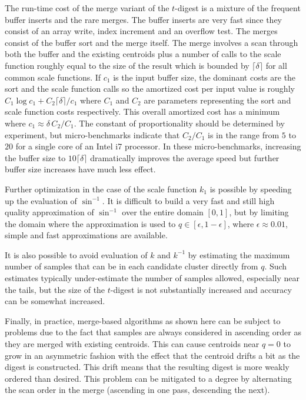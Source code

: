 \documentclass[]{statsoc}
\begin{document}
The run-time cost of the merge variant of the $t$-digest is a mixture of the frequent buffer inserts  and the rare  merges. The buffer inserts are very fast since they consist of an array write, index increment and an overflow test. The merges consist of the buffer sort and the merge itself. The merge involves a scan through both the buffer and the existing centroids plus a number of calls to the scale function roughly equal to the size of the result which is bounded by $ \lceil \delta \rceil$ for all common scale functions. If $c_1$ is the input buffer size, the dominant costs are the sort and the scale function calls so the amortized cost per input value is roughly $C_1 \log c_1 + C_2 \lceil \delta \rceil / c_1$ where $C_1$ and $C_2$ are parameters representing the sort and scale function costs respectively. This overall amortized cost has a minimum where $c_1 \approx \delta\, C_2  / C_1$. The constant of proportionality should be determined by experiment, but micro-benchmarks indicate that $C_2 / C_1$ is in the range from $5$ to $20$ for a single core of an Intel i7 processor. In these micro-benchmarks, increasing the buffer size to $10 \lceil \delta \rceil$ dramatically improves the average speed but further buffer size increases have much less effect. 

Further optimization in the case of the scale function $k_1$ is possible by speeding up the evaluation of $\sin^{-1}$. It is difficult to build a very fast and still high quality approximation of $\sin^{-1}$ over the entire domain $[0,1]$, but by limiting the domain where the approximation is used to $q \in [\epsilon, 1-\epsilon]$, where $\epsilon \approx 0.01$, simple and fast approximations are available.

It is also possible to avoid evaluation of $k$ and $k^{-1}$ by estimating the maximum number of samples that can be in each candidate cluster directly from $q$. Such estimates typically under-estimate the number of samples allowed, especially near the tails, but the size of the $t$-digest is not substantially increased and accuracy can be somewhat increased.

Finally, in practice, merge-based algorithms as shown here can be subject to problems due to the fact that samples are always considered in ascending order as they are merged with existing centroids. This can cause centroids near $q=0$ to grow in an asymmetric fashion with the effect that the centroid drifts a bit as the digest is constructed. This drift means that the resulting digest is more weakly ordered than desired. This problem can be mitigated to a degree by alternating the scan order in the merge (ascending in one pass, descending the next). 
\end{document}
